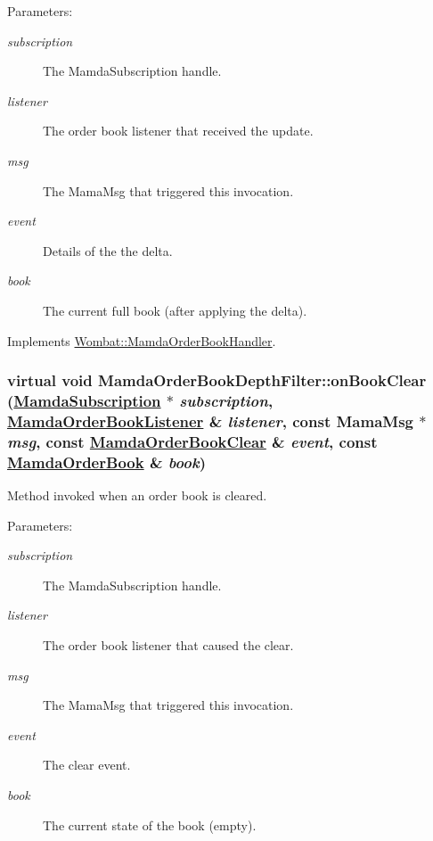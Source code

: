 \begin{Desc}
\item[Parameters:]
\begin{description}
\item[{\em subscription}]The Mamda\-Subscription handle. \item[{\em listener}]The order book listener that received the update. \item[{\em msg}]The Mama\-Msg that triggered this invocation. \item[{\em event}]Details of the the delta. \item[{\em book}]The current full book (after applying the delta). \end{description}
\end{Desc}


Implements \hyperlink{classWombat_1_1MamdaOrderBookHandler_eaeaeb1763785a609ba8552960acce8f}{Wombat::Mamda\-Order\-Book\-Handler}.\hypertarget{classMamdaOrderBookDepthFilter_70d8025a3e8ce565c80dfeb5c6dc66eb}{
\subsubsection[onBookClear]{\setlength{\rightskip}{0pt plus 5cm}virtual void Mamda\-Order\-Book\-Depth\-Filter::on\-Book\-Clear (\hyperlink{classWombat_1_1MamdaSubscription}{Mamda\-Subscription} $\ast$ {\em subscription}, \hyperlink{classWombat_1_1MamdaOrderBookListener}{Mamda\-Order\-Book\-Listener} \& {\em listener}, const Mama\-Msg $\ast$ {\em msg}, const \hyperlink{classWombat_1_1MamdaOrderBookClear}{Mamda\-Order\-Book\-Clear} \& {\em event}, const \hyperlink{classWombat_1_1MamdaOrderBook}{Mamda\-Order\-Book} \& {\em book})}}
\label{classMamdaOrderBookDepthFilter_70d8025a3e8ce565c80dfeb5c6dc66eb}


Method invoked when an order book is cleared. 

\begin{Desc}
\item[Parameters:]
\begin{description}
\item[{\em subscription}]The Mamda\-Subscription handle. \item[{\em listener}]The order book listener that caused the clear. \item[{\em msg}]The Mama\-Msg that triggered this invocation. \item[{\em event}]The clear event. \item[{\em book}]The current state of the book (empty). \end{description}
\end{Desc}


